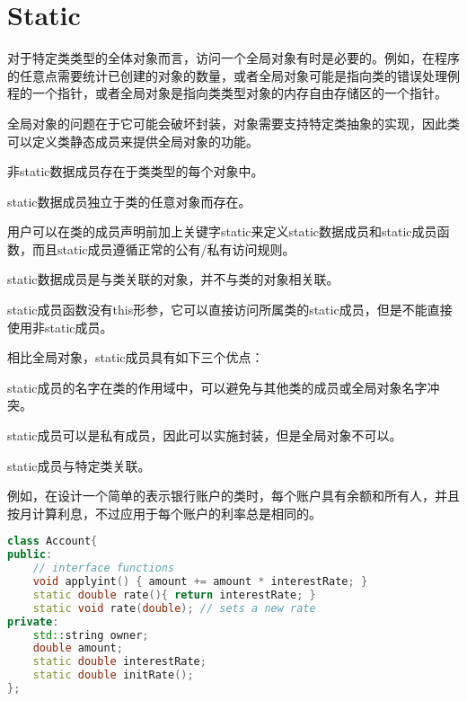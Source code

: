 \section{Static}



对于特定类类型的全体对象而言，访问一个全局对象有时是必要的。例如，在程序的任意点需要统计已创建的对象的数量，或者全局对象可能是指向类的错误处理例程的一个指针，或者全局对象是指向类类型对象的内存自由存储区的一个指针。

全局对象的问题在于它可能会破坏封装，对象需要支持特定类抽象的实现，因此类可以定义类静态成员来提供全局对象的功能。


\begin{compactitem}
\item 非static数据成员存在于类类型的每个对象中。
\item static数据成员独立于类的任意对象而存在。
\end{compactitem}

用户可以在类的成员声明前加上关键字static来定义static数据成员和static成员函数，而且static成员遵循正常的公有/私有访问规则。


\begin{compactitem}
\item static数据成员是与类关联的对象，并不与类的对象相关联。
\item static成员函数没有this形参，它可以直接访问所属类的static成员，但是不能直接使用非static成员。
\end{compactitem}

相比全局对象，static成员具有如下三个优点：

\begin{compactenum}
\item static成员的名字在类的作用域中，可以避免与其他类的成员或全局对象名字冲突。
\item static成员可以是私有成员，因此可以实施封装，但是全局对象不可以。
\item static成员与特定类关联。
\end{compactenum}

例如，在设计一个简单的表示银行账户的类时，每个账户具有余额和所有人，并且按月计算利息，不过应用于每个账户的利率总是相同的。

\begin{lstlisting}[language=C++]
class Account{
public:
	// interface functions
	void applyint() { amount += amount * interestRate; }
	static double rate(){ return interestRate; }
	static void rate(double); // sets a new rate
private:
	std::string owner;
	double amount;
	static double interestRate;
	static double initRate();
};
\end{lstlisting}

